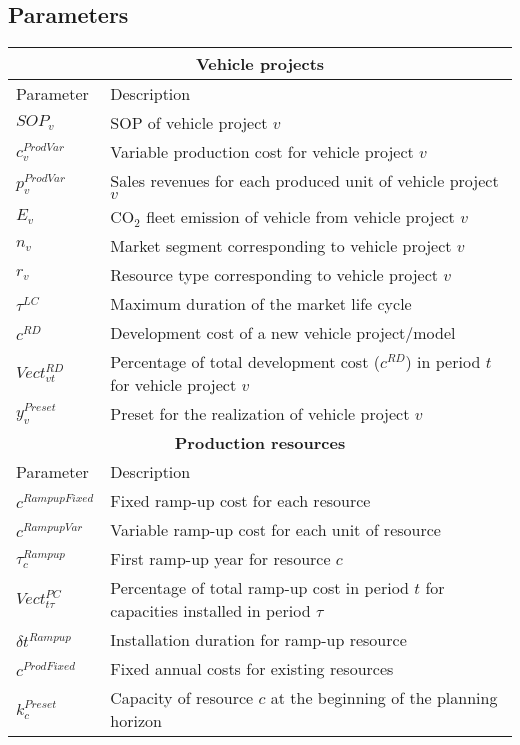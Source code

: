 \subsection{Parameters}\label{subsec: parameters}
\begin{longtable}{lp{11cm}}
\toprule[0.15em]
\multicolumn{2}{c}{\textbf{Vehicle projects}}\\
\midrule
Parameter & Description\\
\midrule
$SOP_v$ & \gls{SOP} of vehicle project $v$\\[0.5em]
$c_v^{ProdVar}$ & Variable production cost for vehicle project $v$\\[0.5em]
$p_v^{ProdVar}$ & Sales revenues for each produced unit of vehicle project $v$\\[0.5em]
$E_v$ & $\text{CO}_2$ fleet emission of vehicle from vehicle project $v$\\[0.5em]
$n_v$ & Market segment corresponding to vehicle project $v$\\[0.5em]
$r_v$ & Resource type corresponding to vehicle project $v$\\[0.5em]
$\tau^{LC}$ & Maximum duration of the market life cycle\\[0.5em]
$c^{RD}$ & Development cost of a new vehicle project/model\\[0.5em]
$Vect_{vt}^{RD}$ & Percentage of total development cost ($c^{RD}$) in period $t$ for vehicle project $v$\\[0.5em]
$y_{v}^{Preset}$ & Preset for the realization of vehicle project $v$\\[0.5em]
\toprule[0.15em]
\multicolumn{2}{c}{\textbf{Production resources}} \\
\midrule
Parameter & Description\\
\midrule
$c^{RampupFixed}$ & Fixed ramp-up cost for each resource\\[0.5em]
$c^{RampupVar}$ & Variable ramp-up cost for each unit of resource\\[0.5em]
$\tau_c^{Rampup}$ & First ramp-up year for resource $c$\\[0.5em]
$Vect_{t\tau}^{PC}$ & Percentage of total ramp-up cost in period $t$ for capacities installed in period $\tau$\\[0.5em]
$\delta t^{Rampup}$ & Installation duration for ramp-up resource\\[0.5em]
$c^{ProdFixed}$ & Fixed annual costs for existing resources\\[0.5em]
$k_{c}^{Preset}$ & Capacity of resource $c$ at the beginning of the planning horizon\\[0.5em]

\end{longtable}
